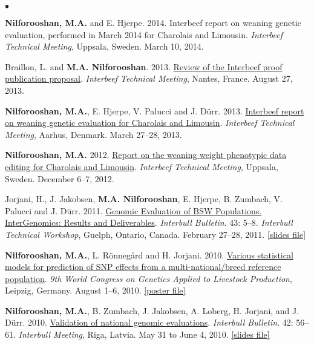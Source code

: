 \documentclass[margin,line]{res}
\newenvironment{list2}{
  \begin{list}{$\bullet$}{%
      \setlength{\itemsep}{0in}
      \setlength{\parsep}{0in} \setlength{\parskip}{0in}
      \setlength{\topsep}{0in} \setlength{\partopsep}{0in}
      \setlength{\leftmargin}{0.2in}}}{\end{list}}
\begin{document}
\begin{resume}
\begin{list2}
\item {\bf Nilforooshan, M.A.} and E. Hjerpe. 2014. Interbeef report on weaning genetic evaluation, performed in March 2014 for Charolais and Limousin. {\em Interbeef Technical Meeting}, Uppsala, Sweden. March 10, 2014.
\item Braillon, L. and {\bf M.A. Nilforooshan}. 2013. \href{https://drive.google.com/file/d/0B2l_izQwJmVpYWE2VndwNGhJblU/view?usp=sharing}{Review of the Interbeef proof publication proposal}. {\em Interbeef Technical Meeting}, Nantes, France. August 27, 2013.
\item {\bf Nilforooshan, M.A.}, E. Hjerpe, V. Palucci and J. D\"{u}rr. 2013. \href{https://drive.google.com/file/d/0B2l_izQwJmVpZ2RRcXc0bS11RmM/view?usp=sharing}{Interbeef report on weaning genetic evaluation for Charolais and Limousin}. {\em Interbeef Technical Meeting}, Aarhus, Denmark. March 27--28, 2013.
\item {\bf Nilforooshan, M.A.} 2012. \href{https://drive.google.com/file/d/0B2l_izQwJmVpLVY5NU1UZGR6czA/view?usp=sharing}{Report on the weaning weight phenotypic data editing for Charolais and Limousin}. {\em Interbeef Technical Meeting}, Uppsala, Sweden. December 6--7, 2012.
\item Jorjani, H., J. Jakobsen, {\bf M.A. Nilforooshan}, E. Hjerpe, B. Zumbach, V. Palucci and J. D\"{u}rr. 2011. \href{https://journal.interbull.org/index.php/ib/article/view/1250}{Genomic Evaluation of BSW Populations. InterGenomics: Results and Deliverables}. {\em Interbull Bulletin}. 43: 5--8. {\em Interbull Technical Workshop}, Guelph, Ontario, Canada. February 27--28, 2011. \href{https://drive.google.com/file/d/0B2l_izQwJmVpbGh3ZC1iRWhCWVE/view?usp=sharing}{[slides file]}
\item {\bf Nilforooshan, M.A.}, L. R\"{o}nneg\r{a}rd and H. Jorjani. 2010. \href{http://www.wcgalp.org/proceedings/2010/various-statistical-models-prediction-snp-effects-multi-nationalbreed-reference}{Various statistical models for prediction of SNP effects from a multi-national/breed reference population}. {\em 9th World Congress on Genetics Applied to Livestock Production}, Leipzig, Germany. August 1--6, 2010. \href{https://drive.google.com/file/d/0B2l_izQwJmVpMmxGRzJjMURoTlE/view?usp=sharing}{[poster file]}
\item {\bf Nilforooshan, M.A.}, B. Zumbach, J. Jakobsen, A. Loberg, H. Jorjani, and J. D\"{u}rr. 2010. \href{https://journal.interbull.org/index.php/ib/article/view/1158}{Validation of national genomic evaluations}. {\em Interbull Bulletin}. 42: 56--61. {\em Interbull Meeting}, Riga, Latvia. May 31 to June 4, 2010. \href{https://drive.google.com/file/d/0B2l_izQwJmVpRnlPa0YzS3ZCU1E/view?usp=sharing}{[slides file]}

\end{list2}
\end{resume}
\end{document}
